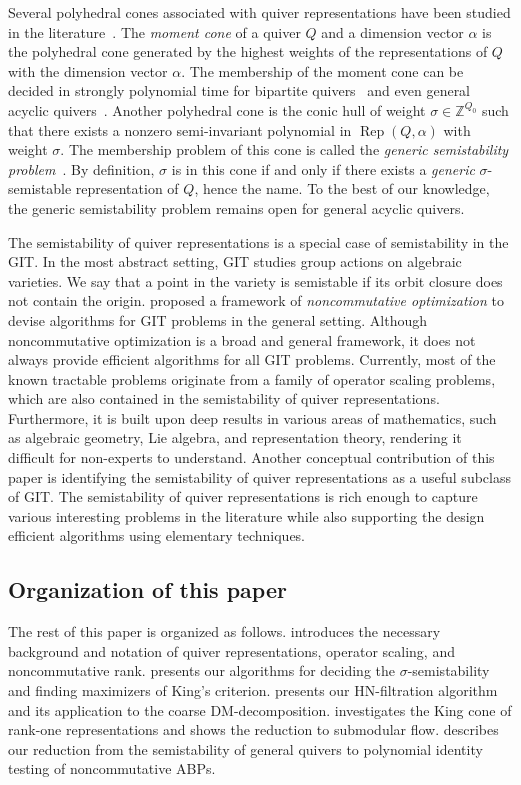 \documentclass[a4paper,11pt]{article}
\numberwithin{equation}{section}
\newcommand{\Z}{\mathbb{Z}}
\DeclareMathOperator{\Rep}{Rep}
\begin{document}
Several polyhedral cones associated with quiver representations have been studied in the literature~\citep{Chindris2022c,Vergne2023}.
The \emph{moment cone} of a quiver $Q$ and a dimension vector $\alpha$ is the polyhedral cone generated by the highest weights of the representations of $Q$ with the dimension vector $\alpha$.
The membership of the moment cone can be decided in strongly polynomial time for bipartite quivers~\citep{Chindris2022c} and even general acyclic quivers~\citep{Vergne2023}.
Another polyhedral cone is the conic hull of weight $\sigma \in \Z^{Q_0}$ such that there exists a nonzero semi-invariant polynomial in $\Rep(Q, \alpha)$ with weight $\sigma$.
The membership problem of this cone is called the \emph{generic semistability problem}~\citep{Chindris2022c}.
By definition, $\sigma$ is in this cone if and only if there exists a \emph{generic} $\sigma$-semistable representation of $Q$, hence the name.
To the best of our knowledge, the generic semistability problem remains open for general acyclic quivers.

The semistability of quiver representations is a special case of semistability in the GIT.
In the most abstract setting, GIT studies group actions on algebraic varieties.
We say that a point in the variety is semistable if its orbit closure does not contain the origin.
\citet{Burgisser2019} proposed a framework of \emph{noncommutative optimization} to devise algorithms for GIT problems in the general setting.
Although noncommutative optimization is a broad and general framework, it does not always provide efficient algorithms for all GIT problems.
Currently, most of the known tractable problems originate from a family of operator scaling problems, which are also contained in the semistability of quiver representations.
Furthermore, it is built upon deep results in various areas of mathematics, such as algebraic geometry, Lie algebra, and representation theory, rendering it difficult for non-experts to understand.
Another conceptual contribution of this paper is identifying the semistability of quiver representations as a useful subclass of GIT.
The semistability of quiver representations is rich enough to capture various interesting problems in the literature while also supporting the design efficient algorithms using elementary techniques.

\subsection{Organization of this paper}
The rest of this paper is organized as follows.
 introduces the necessary background and notation of quiver representations, operator scaling, and noncommutative rank.
 presents our algorithms for deciding the $\sigma$-semistability and finding maximizers of King's criterion.
 presents our HN-filtration algorithm and its application to the coarse DM-decomposition.
 investigates the King cone of rank-one representations and shows the reduction to submodular flow.
 describes our reduction from the semistability of general quivers to polynomial identity testing of noncommutative ABPs.
\end{document}
